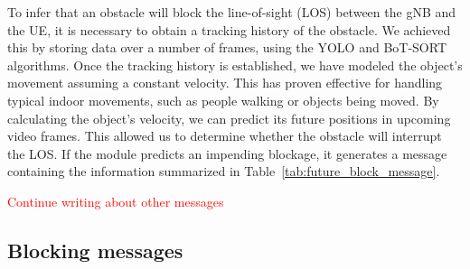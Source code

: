 To infer that an obstacle will block the line-of-sight (LOS) between the gNB and the UE, it is necessary to obtain a tracking history of the obstacle.
We achieved this by storing data over a number of frames, using the YOLO and BoT-SORT algorithms.
Once the tracking history is established, we have modeled the object's movement assuming a constant velocity.
This has proven effective for handling typical indoor movements, such as people walking or objects being moved.
By calculating the object's velocity, we can predict its future positions in upcoming video frames.
This allowed us to determine whether the obstacle will interrupt the LOS\@.
If the module predicts an impending blockage, it generates a message containing the information summarized in Table~\ref{tab:future_block_message}.


\begin{table}[H]
    \caption{Components of the Prediction of Blockage Payload}
    \label{tab:future_block_message}
    \centering
\end{table}



\textcolor{red}{Continue writing about other messages}
\subsection{Blocking messages}

